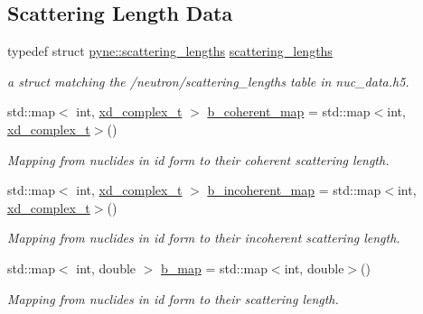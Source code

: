 \subsection*{Scattering Length Data}
\begin{DoxyCompactItemize}
\item 
\mbox{\label{namespacepyne_a9a7904773bd3c8c5b8c4e10360c78c89}} 
typedef struct \hyperlink{structpyne_1_1scattering__lengths}{pyne\+::scattering\+\_\+lengths} \hyperlink{namespacepyne_a9a7904773bd3c8c5b8c4e10360c78c89}{scattering\+\_\+lengths}
\begin{DoxyCompactList}\small\item\em a struct matching the \textquotesingle{}/neutron/scattering\+\_\+lengths\textquotesingle{} table in nuc\+\_\+data.\+h5. \end{DoxyCompactList}\item 
\mbox{\label{namespacepyne_a2bf1da1e7baf82a149d383b448cb4558}} 
std\+::map$<$ int, \hyperlink{structxd__complex__t}{xd\+\_\+complex\+\_\+t} $>$ \hyperlink{namespacepyne_a2bf1da1e7baf82a149d383b448cb4558}{b\+\_\+coherent\+\_\+map} = std\+::map$<$int, \hyperlink{structxd__complex__t}{xd\+\_\+complex\+\_\+t}$>$()
\begin{DoxyCompactList}\small\item\em Mapping from nuclides in id form to their coherent scattering length. \end{DoxyCompactList}\item 
\mbox{\label{namespacepyne_a1206591ebb3e8305358495b8c8730b65}} 
std\+::map$<$ int, \hyperlink{structxd__complex__t}{xd\+\_\+complex\+\_\+t} $>$ \hyperlink{namespacepyne_a1206591ebb3e8305358495b8c8730b65}{b\+\_\+incoherent\+\_\+map} = std\+::map$<$int, \hyperlink{structxd__complex__t}{xd\+\_\+complex\+\_\+t}$>$()
\begin{DoxyCompactList}\small\item\em Mapping from nuclides in id form to their incoherent scattering length. \end{DoxyCompactList}\item 
\mbox{\label{namespacepyne_ab4e41cc84fefb9085e62ad030a2b4ee6}} 
std\+::map$<$ int, double $>$ \hyperlink{namespacepyne_ab4e41cc84fefb9085e62ad030a2b4ee6}{b\+\_\+map} = std\+::map$<$int, double$>$()
\begin{DoxyCompactList}\small\item\em Mapping from nuclides in id form to their scattering length. \end{DoxyCompactList}\item 

\end{DoxyCompactItemize}
